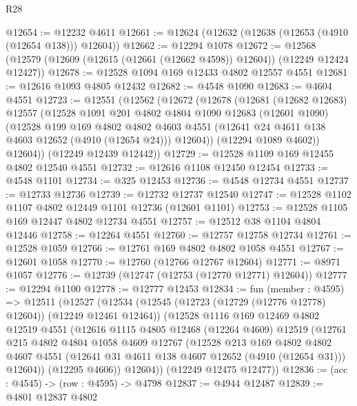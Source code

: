 \begin{lexlean}{R28}
\begin{coremodule}
@12654 := @12232 @4611
@12661 := @12624 (@12632 (@12638 (@12653 (@4910 (@12654 @138))) @12604))
@12662 := @12294 @1078
@12672 := @12568 (@12579 (@12609 (@12615 (@12661 (@12662 @4598)) @12604)) (@12249 @12424 @12427))
@12678 := @12528 @1094 @169 @12433 @4802 @12557 @4551
@12681 := @12616 @1093 @4805 @12432
@12682 := @4548 @1090
@12683 := @4604 @4551
@12723 := @12551
    (@12562
      (@12672
        (@12678
          (@12681
            (@12682 @12683)
            @12557
            (@12528
              @1091
              @201
              @4802
              @4804
              @1090
              @12683
              (@12601 @1090)
              (@12528
                @199
                @169
                @4802
                @4802
                @4603
                @4551
                (@12641 @24 @4611 @138 @4603 @12652 (@4910 (@12654 @24)))
                @12604))
            (@12294 @1089 @4602))
          @12604))
      (@12249 @12439 @12442))
@12729 := @12528 @1109 @169 @12455 @4802 @12540 @4551
@12732 := @12616 @1108 @12450 @12454
@12733 := @4548 @1101
@12734 := @325 @12453
@12736 := @4548 @12734 @4551
@12737 := @12733 @12736
@12739 := @12732 @12737 @12540
@12747 := @12528 @1102 @1107 @4802 @12449 @1101 @12736 (@12601 @1101)
@12753 := @12528 @1105 @169 @12447 @4802 @12734 @4551
@12757 := @12512 @38 @1104 @4804 @12446
@12758 := @12264 @4551
@12760 := @12757 @12758 @12734
@12761 := @12528 @1059
@12766 := @12761 @169 @4802 @4802 @1058 @4551
@12767 := @12601 @1058
@12770 := @12760 (@12766 @12767 @12604)
@12771 := @8971 @1057
@12776 := @12739 (@12747 (@12753 (@12770 @12771) @12604))
@12777 := @12294 @1100
@12778 := @12777 @12453
@12834 := fun (member : @4595) =>
  @12511
    (@12527
      (@12534
        (@12545 (@12723 (@12729 (@12776 @12778) @12604)) (@12249 @12461 @12464))
        (@12528
          @1116
          @169
          @12469
          @4802
          @12519
          @4551
          (@12616
            @1115
            @4805
            @12468
            (@12264 @4609)
            @12519
            (@12761
              @215
              @4802
              @4804
              @1058
              @4609
              @12767
              (@12528
                @213
                @169
                @4802
                @4802
                @4607
                @4551
                (@12641 @31 @4611 @138 @4607 @12652 (@4910 (@12654 @31)))
                @12604))
            (@12295 @4606))
          @12604))
      (@12249 @12475 @12477))
@12836 := (acc : @4545) -> (row : @4595) -> @4798
@12837 := @4944 @12487
@12839 := @4801 @12837 @4802

\end{coremodule}
\end{lexlean}
